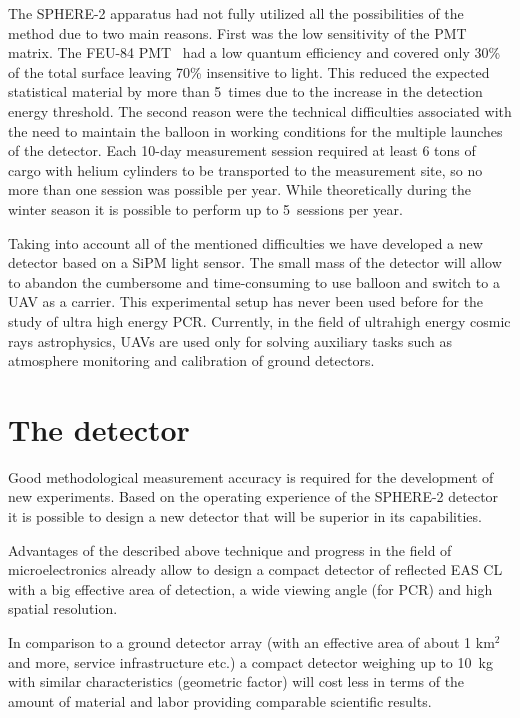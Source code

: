 \documentclass[a4paper,11pt]{article}
\begin{document}
The SPHERE-2 apparatus had not fully utilized all the possibilities of the method due to two main reasons. 
First was the low sensitivity of the PMT matrix. The FEU-84 PMT~\cite{FEU84} had a low quantum efficiency and covered only 30\% of the total surface leaving 70\% insensitive to light. This reduced the expected statistical material by more than 5~times due to the increase in the detection energy threshold. The second reason were the technical difficulties associated with the need to maintain the balloon in working conditions for the multiple launches of the detector. Each 10-day measurement session required at least 6 tons of cargo with helium cylinders to be transported to the measurement site, so no more than one session was possible per year. While theoretically during the winter season it is possible to perform up to 5~sessions per year.

Taking into account all of the  mentioned difficulties we have developed a new detector based on a SiPM light sensor. The small mass of the detector will allow to abandon the cumbersome and time-consuming to use balloon and switch to a UAV as a carrier.
This experimental setup has never been used before for the study of ultra high energy PCR. Currently, in the field of ultrahigh energy cosmic rays astrophysics, UAVs are used only for solving auxiliary tasks such as atmosphere monitoring and calibration of ground detectors.


\section{The detector}

Good methodological measurement accuracy is required for the development of new experiments. 
Based on the operating experience of the SPHERE-2 detector it is possible to design a new detector that will be superior in its capabilities.

Advantages of the described above technique and progress in the field of microelectronics already allow to design a compact detector of reflected EAS CL with a big effective area of detection, a wide viewing angle (for PCR) and high spatial resolution. 

In comparison to a ground detector array (with an effective area of about 1 km$^2$ and more, service infrastructure etc.) a compact detector weighing up to 10~kg with similar characteristics (geometric factor) will cost less in terms of the amount of material and labor providing comparable scientific results.
\end{document}
